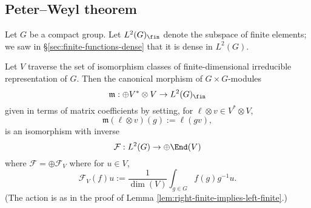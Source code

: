\documentclass[reqno]{amsart} 
\begin{document}
\subsection{Peter--Weyl theorem}
\label{sec:org9fd6b0d}
Let $G$ be a compact group.
Let $L^2(G)_{\fin}$ denote the subspace of finite elements;
we saw in \S\ref{sec:finite-functions-dense} that it is dense in $L^2(G)$.
\begin{theorem}
  Let $V$ traverse the set of isomorphism classes
  of finite-dimensional irreducible representation of $G$.
  Then the canonical morphism of $G \times G$-modules
  \begin{equation*}
  \mathfrak{m} : \oplus V^* \otimes V \rightarrow L^2(G)_{\fin}
  \end{equation*}
  given in terms of matrix coefficients
  by setting, for $\ell \otimes v \in V^* \otimes V$,
  \begin{equation*}
  \mathfrak{m}(\ell \otimes v)(g) := \ell(g v),
  \end{equation*}
  is an isomorphism
  with inverse
  \begin{equation*}
  \mathcal{F} : L^2(G) \rightarrow \oplus \End(V)
  \end{equation*}
  where $\mathcal{F} = \oplus \mathcal{F}_V$
  where for $u \in V$,
  \begin{equation*}
  \mathcal{F}_V(f) u := \frac{1}{\dim (V)} \int_{g \in G}
  f(g) g^{-1} u.
  \end{equation*}
  (The action is as in the proof
  of Lemma \ref{lem:right-finite-implies-left-finite}.)
\end{theorem}
\end{document}
